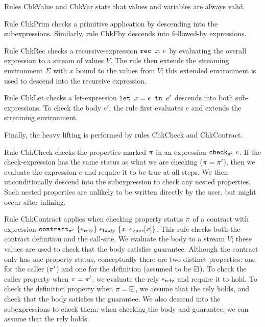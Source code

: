 Rules {\sc ChkValue} and {\sc ChkVar} state that values and variables are always valid.

Rule {\sc ChkPrim} checks a primitive application by descending into the subexpressions.
Similarly, rule {\sc ChkFby} descends into followed-by expressions.

Rule {\sc ChkRec} checks a recursive-expression $\texttt{rec~} x\hspace{-0.1em}.~e$ by evaluating the overall expression to a stream of values $V$.
The rule then extends the streaming environment $\Sigma$ with $x$ bound to the values from $V$; this extended environment is used to descend into the recursive expression.

Rule {\sc ChkLet} checks a let-expression $\texttt{let~} x = e \texttt{~in~} e'$ descends into both sub-expressions.
To check the body $e'$, the rule first evaluates $e$ and extends the streaming environment.

Finally, the heavy lifting is performed by rules {\sc ChkCheck} and {\sc ChkContract}.

Rule {\sc ChkCheck} checks the properties marked $\pi$ in an expression $\texttt{check}_{\pi'}~e$.
If the check-expression has the same status as what we are checking ($\pi = \pi'$), then we evaluate the expression $e$ and require it to be true at all steps.
We then unconditionally descend into the subexpression to check any nested properties.
Such nested properties are unlikely to be written directly by the user, but might occur after inlining.

Rule {\sc ChkContract} applies when checking property status $\pi$ of a contract with expression $\texttt{contract}_{\pi'}~\{e_{\text{rely}}\}~e_{\text{body}}~\{x\hspace{-0.1em}.~e_{\text{guar}}[x]\}$.
This rule checks both the contract definition and the call-site.
We evaluate the body to a stream $V$; these values are used to check that the body satisfies guarantee.
Although the contract only has one property status, conceptually there are two distinct properties: one for the caller ($\pi'$) and one for the definition (assumed to be $\PSValid$).
To check the caller property when $\pi = \pi'$, we evaluate the rely $e_{\text{rely}}$ and require it to hold.
To check the definition property when $\PStatus = \PSValid$, we assume that the rely holds, and check that the body satisfies the guarantee.
We also descend into the subexpressions to check them; when checking the body and guarantee, we can assume that the rely holds.

